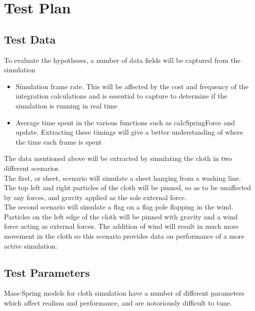 \chapter{Test Plan}

\section{Test Data}
To evaluate the hypotheses, a number of data fields will be captured from the simulation
\begin{itemize}
\item{Simulation frame rate. This will be affected by the cost and frequency of the integration calculations and is essential to capture to determine if the simulation is running in real time}
\item{Average time spent in the various functions such as calcSpringForce and update. Extracting these timings will give a better understanding of where the time each frame is spent}
\end{itemize}
The data mentioned above will be extracted by simulating the cloth in two different scenarios.
\\The first, or sheet, scenario will simulate a sheet hanging from a washing line. The top left and right particles of the cloth will be pinned, so as to be unaffected by any forces, and gravity applied as the sole external force.
\\The second scenario will simulate a flag on a flag pole flapping in the wind. Particles on the left edge of the cloth will be pinned with gravity and a wind force acting as external forces. The addition of wind will result in much more movement in the cloth so this scenario provides data on performance of a more active simulation.

\section{Test Parameters}
Mass-Spring models for cloth simulation have a number of different parameters which affect realism and performance, and are notoriously difficult to tune.

